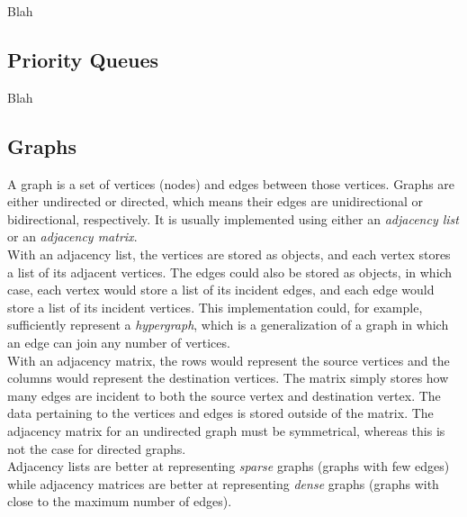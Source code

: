 Blah


\subsection{Priority Queues}

Blah


\subsection{Graphs}


A graph is a set of vertices (nodes) and edges between those vertices. Graphs are either undirected or directed, which means their edges are unidirectional or bidirectional, respectively. It is usually implemented using either an \textit{adjacency list} or an \textit{adjacency matrix}. \\

With an adjacency list, the vertices are stored as objects, and each vertex stores a list of its adjacent vertices. The edges could also be stored as objects, in which case, each vertex would store a list of its incident edges, and each edge would store a list of its incident vertices. This implementation could, for example, sufficiently represent a \textit{hypergraph}, which is a generalization of a graph in which an edge can join any number of vertices. \\

With an adjacency matrix, the rows would represent the source vertices and the columns would represent the destination vertices. The matrix simply stores how many edges are incident to both the source vertex and destination vertex. The data pertaining to the vertices and edges is stored outside of the matrix. The adjacency matrix for an undirected graph must be symmetrical, whereas this is not the case for directed graphs. \\

Adjacency lists are better at representing \textit{sparse} graphs (graphs with few edges) while adjacency matrices are better at representing \textit{dense} graphs (graphs with close to the maximum number of edges).

